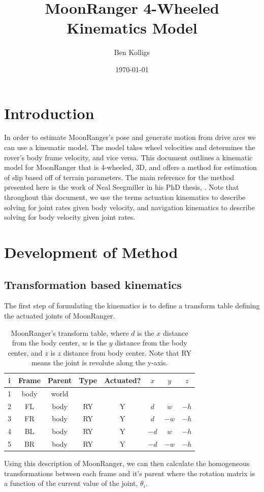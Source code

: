 \documentclass[12pt]{article}
\title{MoonRanger 4-Wheeled Kinematics Model}
\author{Ben Kolligs}
\date{\today}
\begin{document}
\maketitle

\section{Introduction}
In order to estimate MoonRanger's pose and generate motion from drive arcs we can use a kinematic model. 
The  model takes wheel velocities and determines the rover's body frame velocity, and vice versa. 
This document outlines a kinematic model for MoonRanger that is 4-wheeled, 3D, and offers a method for estimation of slip based off of terrain parameters. 
The main reference for the method presented here is the work of Neal Seegmiller in his PhD thesis, \cite{Seegmiller-2014-7945}. 
Note that throughout this document, we use the terms actuation kinematics to describe solving for joint rates given body velocity, and navigation kinematics to describe solving for body velocity given joint rates. 

\section{Development of Method}
\subsection{Transformation based kinematics}
The first step of formulating the kinematics is to define a transform table defining the actuated joints of MoonRanger. 
\begin{table}[H]
    \centering
    \begin{tabular}{|c|c|c|c|c|c|c|c|}
        \hline
        \bf{i} & \bf{Frame} & \bf{Parent} & \bf{Type} &\bf{Actuated?} & \bf{$x$} & \bf{$y$} & \bf{$z$} \\
        \hline
         1 & body & world & & & & & \\
         \hline
         2 & FL & body & RY & Y & $d$ & $w$ & $-h$ \\
         \hline
         3 & FR & body & RY & Y & $d$ & $-w$ & $-h$ \\
         \hline
         4 & BL & body & RY & Y & $-d$ & $w$ & $-h$ \\
         \hline
         5 & BR & body & RY & Y & $-d$ & $-w$ & $-h$ \\
         \hline
    \end{tabular}
    \caption{MoonRanger's transform table, where $d$ is the $x$ distance from the body center, $w$ is the $y$ distance from the body center, and $z$ is $z$ distance from body center. Note that RY means the joint is revolute along the y-axis.}
    \label{tab:transform graph}
\end{table}
Using this description of MoonRanger, we can then calculate the homogeneous transformations between each frame and it's parent where the rotation matrix is a function of the current value of the joint, $\theta_i$.
\end{document}

